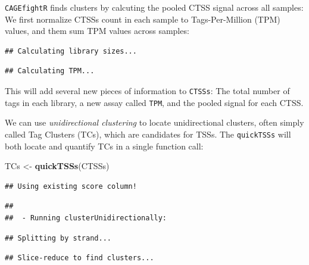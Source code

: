 \documentclass[9pt,a4paper,]{extarticle}
\newenvironment{Shaded}{\begin{snugshade}}{\end{snugshade}}
\newcommand{\KeywordTok}[1]{\textcolor[rgb]{0.13,0.29,0.53}{\textbf{{#1}}}}
\newcommand{\StringTok}[1]{\textcolor[rgb]{0.31,0.60,0.02}{{#1}}}
\newcommand{\NormalTok}[1]{{#1}}
\begin{document}
\texttt{CAGEfightR} finds clusters by calcuting the pooled CTSS signal across all samples: We first normalize CTSSs count in each sample to Tags-Per-Million (TPM) values, and them sum TPM values across samples:

\begin{Shaded}
\end{Shaded}

\begin{verbatim}
## Calculating library sizes...
\end{verbatim}

\begin{verbatim}
## Calculating TPM...
\end{verbatim}

This will add several new pieces of information to \texttt{CTSSs}: The total number of tags in each library, a new assay called \texttt{TPM}, and the pooled signal for each CTSS.

We can use \emph{unidirectional clustering} to locate unidirectional clusters, often simply called Tag Clusters (TCs), which are candidates for TSSs. The \texttt{quickTSSs} will both locate and quantify TCs in a single function call:

\begin{Shaded}
\begin{Highlighting}[]
\NormalTok{TCs <-}\StringTok{ }\KeywordTok{quickTSSs}\NormalTok{(CTSSs)}
\end{Highlighting}
\end{Shaded}

\begin{verbatim}
## Using existing score column!
\end{verbatim}

\begin{verbatim}
## 
##  - Running clusterUnidirectionally:
\end{verbatim}

\begin{verbatim}
## Splitting by strand...
\end{verbatim}

\begin{verbatim}
## Slice-reduce to find clusters...
\end{verbatim}
\end{document}
